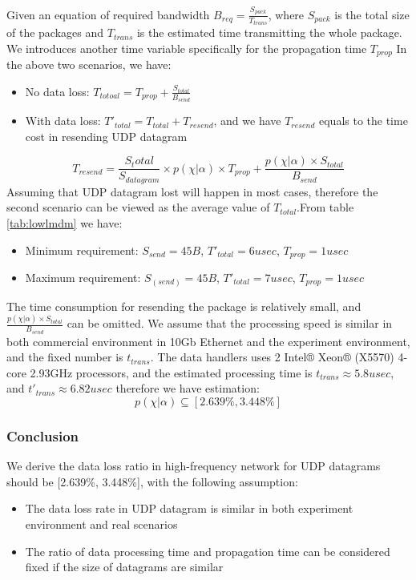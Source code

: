 \documentclass[11pt,openright,a4paper]{report}
\begin{document}
Given an equation of required bandwidth $B_{req}=\frac{S_{pack}}{T_{trans}}$, where $S_{pack}$ is the total size of the packages and $T_{trans}$ is the estimated time transmitting the whole package. We introduces another time variable specifically for the propagation time $T_{prop}$ In the above two scenarios, we have:
\begin{itemize}
	\item No data loss: $T_{totoal}=T_{prop}+\frac{S_{total}}{B_{send}}$
	\item With data loss: ${T}'_{total}=T_{total}+T_{resend}$, and we have $T_{resend}$ equals to the time cost in resending UDP datagram
\end{itemize}
\begin{equation}
T_{resend}=\frac{S_total}{S_{datagram}}\times p(\chi|\alpha) \times T_{prop} + \frac{p(\chi | \alpha) \times S_{total}}{B_{send}}
\end{equation}
Assuming that UDP datagram lost will happen in most cases, therefore the second scenario can be viewed as the average value of $T_{total}.$From table \ref{tab:lowlmdm} we have:
\begin{itemize}
	\item Minimum requirement: $S_{send}=45B$, ${T}'_{total}=6usec$, $T_{prop}=1usec$
	\item Maximum requirement: $S_(send)=45B$, ${T}'_{total}=7usec$, $T_{prop}=1usec$
\end{itemize} 
The time consumption for resending the package is relatively small, and $\frac{p(\chi | \alpha) \times S_{total}}{B_{send}}$ can be omitted. We assume that the processing speed is similar in both commercial environment in 10Gb Ethernet and the experiment environment, and the fixed number is $t_{trans}$. The data handlers uses 2 Intel® Xeon® (X5570) 4-core 2.93GHz processors\cite{ibm2011highfrequency}, and the estimated processing time is $t_{trans} \approx 5.8usec$, and ${t}'_{trans} \approx 6.82usec$ therefore we have estimation: 
\begin{equation}
	p(\chi | \alpha) \subseteq [2.639\%, 3.448\%] 
\end{equation}
\subsubsection{Conclusion}
We derive the data loss ratio in high-frequency network for UDP datagrams should be  [2.639\%, 3.448\%], with the following assumption:
\begin{itemize}
	\item The data loss rate in UDP datagram is similar in both experiment environment and real scenarios
	\item The ratio of data processing time and propagation time can be considered fixed if the size of datagrams are similar
\end{itemize}
\end{document}
